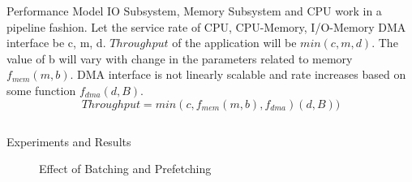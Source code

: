 \documentclass[final]{beamer}
\newlength{\twocolwid}
\begin{document}
\begin{frame}
\begin{columns}[t]
\begin{column}{\twocolwid}
\begin{alertblock}{Performance Model}
IO Subsystem, Memory Subsystem and CPU work in a pipeline fashion. Let the service rate of CPU, CPU-Memory, I/O-Memory DMA interface be c, m, d. $Throughput$ of the application will be $min(c, m, d)$. The value of b will vary with change in the parameters related to memory $f_{mem}(m, b)$. DMA interface is not linearly scalable and rate increases based on some function $f_{dma} (d,B)$.
$$Throughput = min(c, f_{mem}(m, b), f_{dma})(d, B))$$
\end{alertblock} 


\begin{columns}[t,totalwidth=\twocolwid] %
\begin{column}{\twocolwid} %
\begin{exampleblock}{Experiments and Results}
\begin{multicols}{3}

\begin{figure}
\caption{Effect of Batching and Prefetching}
\end{figure}


\end{multicols}
\end{exampleblock}
\end{column}
\end{columns}
\end{column}
\end{columns}
\end{frame}
\end{document}
